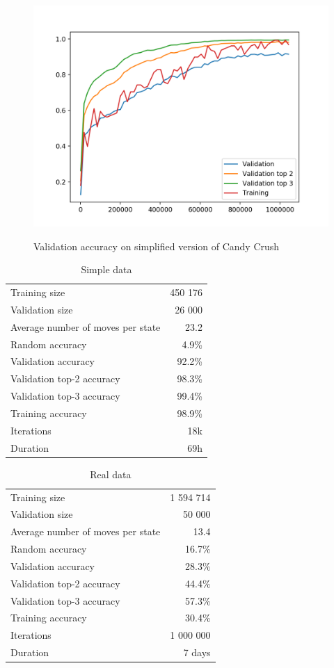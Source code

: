 \documentclass{kththesis}
\begin{document}
\begin{figure}
\centering
\includegraphics[width=\textwidth]{images/candy_small_validation.png}
\label{fig:candy_small_validation_accuracy}
\caption{Validation accuracy on simplified version of Candy Crush}
\end{figure}


\begin{table}
\caption{Simple data}
\centering
\begin{tabular}{ l | r }
\hline
Training size & 450 176\\
Validation size & 26 000\\
Average number of moves per state & 23.2 \\
Random accuracy & 4.9\% \\
Validation accuracy & 92.2\% \\
Validation top-2 accuracy & 98.3\% \\
Validation top-3 accuracy & 99.4\% \\
Training accuracy & 98.9\% \\
Iterations & 18k \\
Duration & 69h \\
\hline
\end{tabular}
\end{table}

\begin{table}
\caption{Real data}
\centering
\begin{tabular}{ l | r }
\hline
Training size & 1 594 714\\
Validation size & 50 000\\
Average number of moves per state & 13.4 \\
Random accuracy & 16.7\% \\
Validation accuracy & 28.3\% \\
Validation top-2 accuracy & 44.4\% \\
Validation top-3 accuracy & 57.3\% \\
Training accuracy & 30.4\% \\
Iterations & 1 000 000 \\
Duration & 7 days \\
\hline
\end{tabular}
\end{table}
\end{document}
